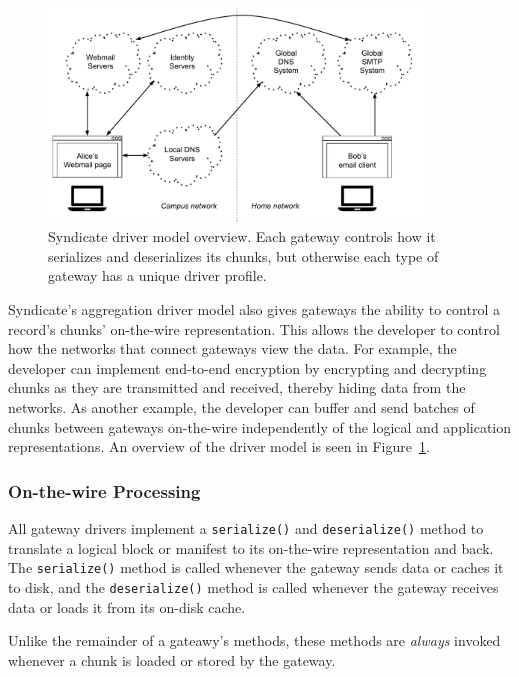 \begin{figure}[h]
   \centering
   \includegraphics[width=0.9\textwidth,page=22]{figures/dissertation-figures}
   \caption{Syndicate driver model overview.  Each gateway controls how it
   serializes and deserializes its chunks, but otherwise each type of gateway has a
   unique driver profile.}
   \label{fig:chap3-syndicate-driver-model}
\end{figure}

Syndicate's aggregation driver model also gives gateways the ability to
control a record's chunks' on-the-wire representation.  This allows the
developer to control how the networks that connect gateways view the data.  For
example, the developer can implement end-to-end encryption by encrypting and
decrypting chunks as they are transmitted and received, thereby hiding
data from the networks.  As another example, the developer can buffer and send
batches of chunks between gateways on-the-wire independently of the logical and
application representations.  An overview of the driver model is seen in
Figure~\ref{fig:chap3-syndicate-driver-model}.

\subsubsection{On-the-wire Processing}

All gateway drivers implement a \texttt{serialize()} and \texttt{deserialize()}
method to translate a logical block or manifest to its on-the-wire
representation and back.  The \texttt{serialize()} method is called whenever the gateway sends
data or caches it to disk, and the \texttt{deserialize()} method is called
whenever the gateway receives data or loads it from its on-disk cache.

Unlike the remainder of a gateawy's methods, these methods are \emph{always}
invoked whenever a chunk is loaded or stored by the gateway.

